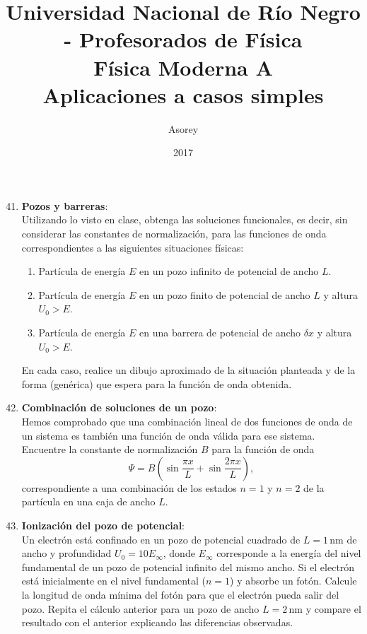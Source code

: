 \documentclass[a4paper,12pt]{article}
\begin{document}
\title{
{\normalsize{Universidad Nacional de Río Negro - Profesorados de Física}}\\
Física Moderna A \\ Aplicaciones a casos simples\\}
\author{Asorey}
\date{2017}
\maketitle

\begin{enumerate}
	\setcounter{enumi}{40}      %
	\item {\bf{Pozos y barreras}}:\\
		Utilizando lo visto en clase, obtenga las soluciones funcionales, es
		decir, sin considerar las constantes de normalización, para las
		funciones de onda correspondientes a las siguientes situaciones
		físicas:
		\begin{enumerate}
			\item Partícula de energía $E$ en un pozo infinito de potencial de
				ancho $L$.
			\item Partícula de energía $E$ en un pozo finito de potencial de
				ancho $L$ y altura $U_0>E$.
			\item Partícula de energía $E$ en una barrera de potencial de ancho
				$\delta x$ y altura $U_0>E$.
		\end{enumerate}
		En cada caso, realice un dibujo aproximado de la situación planteada y
		de la forma (genérica) que espera para la función de onda obtenida.
	
	\item {\bf{Combinación de soluciones de un pozo}}:\\
		Hemos comprobado que una combinación lineal de dos funciones de onda
		de un sistema es también una función de onda válida para ese sistema.
		Encuentre la constante de normalización $B$ para la función de onda
		\[ \Psi = B \left ( \sin \frac{\pi x}{L} + \sin \frac{2 \pi x}{L}
		\right ), \]
		correspondiente a una combinación de los estados $n=1$ y $n=2$ de la
		partícula en una caja de ancho $L$.

	\item {\bf{Ionización del pozo de potencial}}:\\
		Un electrón está confinado en un pozo de potencial cuadrado de
		$L=1$\,nm de ancho y profundidad $U_0=10 E_\infty$, donde $E_\infty$
		corresponde a la energía del nivel fundamental de un pozo de potencial
		infinito del mismo ancho. Si el electrón está inicialmente en el nivel
		fundamental ($n=1$) y absorbe un fotón. Calcule la longitud de onda
		mínima del fotón para que el electrón pueda salir del pozo. Repita el
		cálculo anterior para un pozo de ancho $L=2$\,nm y compare el resultado
		con el anterior explicando las diferencias observadas.


\end{enumerate}
\end{document}
